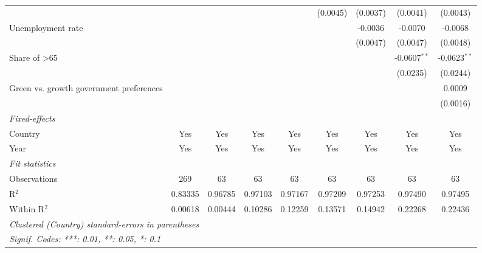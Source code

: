 \begin{table}[htbp]
\begin{tabular}{lcccccccc}
                                                                       &          &          &               &                & (0.0045)       & (0.0037)      & (0.0041)       & (0.0043)\\   
      Unemployment rate                                                &          &          &               &                &                & -0.0036       & -0.0070        & -0.0068\\   
                                                                       &          &          &               &                &                & (0.0047)      & (0.0047)       & (0.0048)\\   
      Share of >65                                                     &          &          &               &                &                &               & -0.0607$^{**}$ & -0.0623$^{**}$\\   
                                                                       &          &          &               &                &                &               & (0.0235)       & (0.0244)\\   
      Green vs. growth government preferences                          &          &          &               &                &                &               &                & 0.0009\\   
                                                                       &          &          &               &                &                &               &                & (0.0016)\\   
      \midrule
      \emph{Fixed-effects}\\
      Country                                                          & Yes      & Yes      & Yes           & Yes            & Yes            & Yes           & Yes            & Yes\\  
      Year                                                             & Yes      & Yes      & Yes           & Yes            & Yes            & Yes           & Yes            & Yes\\  
      \midrule
      \emph{Fit statistics}\\
      Observations                                                     & 269      & 63       & 63            & 63             & 63             & 63            & 63             & 63\\  
      R$^2$                                                            & 0.83335  & 0.96785  & 0.97103       & 0.97167        & 0.97209        & 0.97253       & 0.97490        & 0.97495\\  
      Within R$^2$                                                     & 0.00618  & 0.00444  & 0.10286       & 0.12259        & 0.13571        & 0.14942       & 0.22268        & 0.22436\\  
      \midrule \midrule
      \multicolumn{9}{l}{\emph{Clustered (Country) standard-errors in parentheses}}\\
      \multicolumn{9}{l}{\emph{Signif. Codes: ***: 0.01, **: 0.05, *: 0.1}}\\
   \end{tabular}
\end{table}


